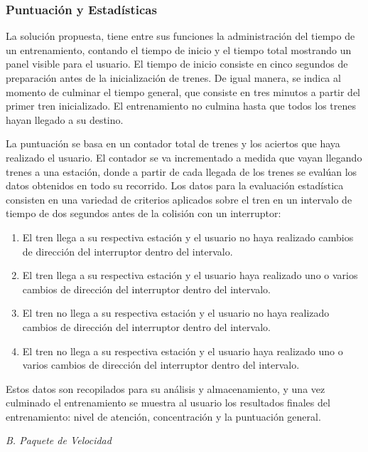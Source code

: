 \documentclass[conference]{IEEEtran}
\begin{document}
\subsubsection*{Puntuación y Estadísticas}

La solución propuesta, tiene entre sus funciones la administración del tiempo de un entrenamiento, contando el tiempo de inicio y el tiempo total mostrando un panel visible para el usuario. El tiempo de inicio consiste en cinco segundos de preparación antes de la inicialización de trenes. De igual manera, se indica al momento de culminar el tiempo general, que consiste en tres minutos a partir del primer tren inicializado. El entrenamiento no culmina hasta que todos los trenes hayan llegado a su destino.

La puntuación se basa en un contador total de trenes y los aciertos que haya realizado el usuario. El contador se va incrementado a medida que vayan llegando trenes a una estación, donde a partir de cada llegada de los trenes se evalúan los datos obtenidos en todo su recorrido. Los datos para la evaluación estadística consisten en una variedad de criterios aplicados sobre el tren en un intervalo de tiempo de dos segundos antes de la colisión con un interruptor:
\begin{enumerate}
\item El tren llega a su respectiva estación y el usuario no haya realizado cambios de dirección del interruptor dentro del intervalo.
\item El tren llega a su respectiva estación y el usuario haya realizado uno o varios cambios de dirección del interruptor dentro del intervalo.
\item El tren no llega a su respectiva estación y el usuario no haya realizado cambios de dirección del interruptor dentro del intervalo.
\item El tren no llega a su respectiva estación y el usuario haya realizado uno o varios cambios de dirección del interruptor dentro del intervalo.
\end{enumerate}

Estos datos son recopilados para su análisis y almacenamiento, y una vez culminado el entrenamiento se muestra al usuario los resultados finales del entrenamiento: nivel de atención, concentración y la puntuación general.
\bigskip

\textit{B. Paquete de Velocidad}
\medskip
\end{document}
